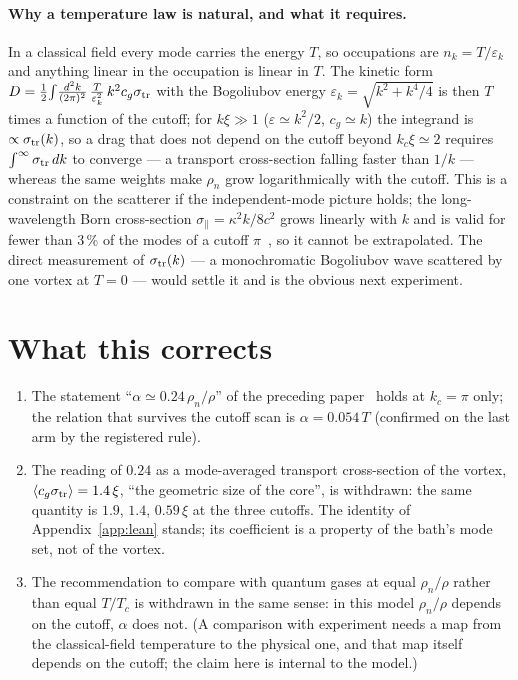 \documentclass[11pt,a4paper]{article}
\begin{document}
\paragraph{Why a temperature law is natural, and what it requires.} In a classical field every mode carries the energy $T$, so occupations are $n_k=T/\varepsilon_k$ and anything linear in the occupation is linear in $T$. The kinetic form
$D=\tfrac12\!\int\!\frac{d^2k}{(2\pi)^2}\,\frac{T}{\varepsilon_k^2}\,k^2c_g\sigma_{\rm tr}$ with the Bogoliubov energy $\varepsilon_k=\sqrt{k^2+k^4/4}$ is then $T$ times a function of the cutoff;
for $k\xi\gg1$ ($\varepsilon\simeq k^2/2$, $c_g\simeq k$) the integrand is $\propto\sigma_{\rm tr}(k)$, so a drag that does not depend on the cutoff beyond $k_c\xi\simeq2$ requires $\int^\infty\sigma_{\rm tr}\,dk$ to converge --- a transport cross-section
falling faster than $1/k$ --- whereas the same weights make $\rho_n$ grow logarithmically with the cutoff. This is a constraint on the scatterer if the independent-mode picture holds; the long-wavelength Born cross-section $\sigma_\parallel=\kappa^2k/8c^2$ grows
linearly with $k$ and is valid for fewer than $3\,\%$ of the modes of a cutoff $\pi$~\cite{Sonin1997}, so it cannot be extrapolated. The direct measurement of $\sigma_{\rm tr}(k)$ --- a monochromatic Bogoliubov wave scattered by one vortex at $T=0$ --- would settle it and is the obvious next experiment.

\section{What this corrects}\label{sec:corrects}

\begin{enumerate}[nosep]
\item The statement ``$\alpha\simeq0.24\,\rho_n/\rho$'' of the preceding paper~\cite{Callens2026a} holds at $k_c=\pi$ only; the relation that survives the cutoff scan is $\alpha=0.054\,T$ (confirmed on the last arm by the registered rule).
\item The reading of $0.24$ as a mode-averaged transport cross-section of the vortex, $\langle c_g\sigma_{\rm tr}\rangle=1.4\,\xi$, ``the geometric size of the core'', is withdrawn: the same quantity is $1.9$, $1.4$, $0.59\,\xi$ at the three cutoffs. The identity of Appendix~\ref{app:lean} stands; its coefficient is a property of the bath's mode set, not of the vortex.
\item The recommendation to compare with quantum gases at equal $\rho_n/\rho$ rather than equal $T/T_c$ is withdrawn in the same sense: in this model $\rho_n/\rho$ depends on the cutoff, $\alpha$ does not. (A comparison with experiment needs a map from the classical-field temperature to the physical one, and that map itself depends on the cutoff; the claim here is internal to the model.)
\end{enumerate}
\end{document}
